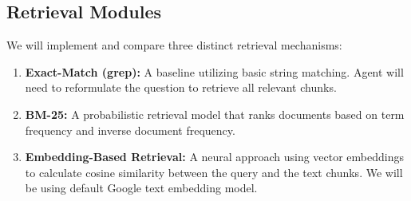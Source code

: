 \documentclass[11pt]{article}
\begin{document}




\subsection{Retrieval Modules}
We will implement and compare three distinct retrieval mechanisms:
\begin{enumerate}
\item \textbf{Exact-Match (grep):} A baseline utilizing basic string matching. Agent will need to reformulate the question to retrieve all relevant chunks.
\item \textbf{BM-25:} A probabilistic retrieval model that ranks documents based on term frequency and inverse document frequency.
\item \textbf{Embedding-Based Retrieval:} A neural approach using vector embeddings to calculate cosine similarity between the query and the text chunks. We will be using default Google text embedding model.
\end{enumerate}
\end{document}
